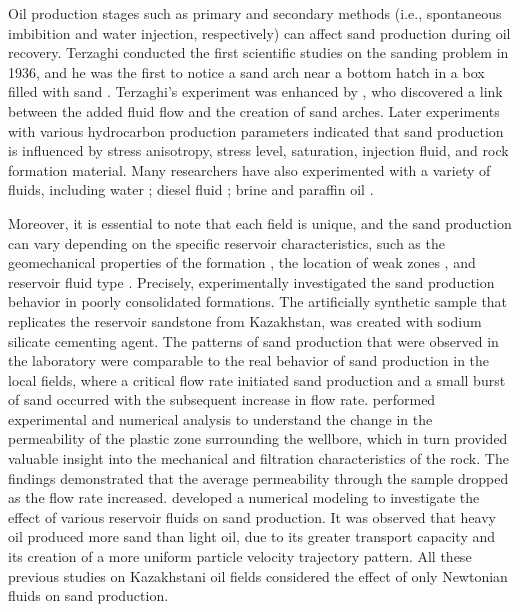 \documentclass{article}
\begin{document}
Oil production stages such as primary and secondary methods (i.e., spontaneous imbibition and water injection, respectively) can affect sand production during oil recovery.  
Terzaghi conducted the first scientific studies on the sanding problem in 1936, and he was the first to notice a sand arch near a bottom hatch in a box filled with sand \citep{terzaghi1936stress}. Terzaghi's experiment was enhanced by \cite{hall1970stability}, who discovered a link between the added fluid flow and the creation of sand arches. Later experiments with various hydrocarbon production parameters indicated that sand production is influenced by stress anisotropy, stress level, saturation, injection fluid, and rock formation material. Many researchers have also experimented with a variety of fluids, including water \citep{wang2001borehole, li2019sand}; diesel fluid \citep{fattahpour2012experimental}; brine \citep{kooijman1996horizontal} and paraffin oil \citep{papamichos2001volumetric}. 

Moreover, it is essential to note that each field is unique, and the sand production can vary depending on the specific reservoir characteristics, such as the geomechanical properties of the formation  \cite{kozhagulova2021integrated}, the location of weak zones \cite{shabdirova2020experimental}, and reservoir fluid type \cite{khamitov2022numerical}. Precisely, \cite{kozhagulova2021integrated} experimentally investigated the sand production behavior in poorly consolidated formations. The artificially synthetic sample that replicates the reservoir sandstone from Kazakhstan, was created with sodium silicate cementing agent. The patterns of sand production that were observed in the laboratory were comparable to the real behavior of sand production in the local fields, where a critical flow rate initiated sand production and a small burst of sand occurred with the subsequent increase in flow rate. \cite{shabdirova2020experimental} performed experimental and numerical analysis to understand the change in the permeability of the plastic zone surrounding the wellbore, which in turn provided valuable insight into the mechanical and filtration characteristics of the rock. The findings demonstrated that the average permeability through the sample dropped as the flow rate increased. \cite{khamitov2022numerical} developed a numerical modeling to investigate the effect of various reservoir fluids on sand production. It was observed that heavy oil produced more sand than light oil, due to its greater transport capacity and its creation of a more uniform particle velocity trajectory pattern. All these previous studies on Kazakhstani oil fields considered the effect of only Newtonian fluids on sand production.
\end{document}
